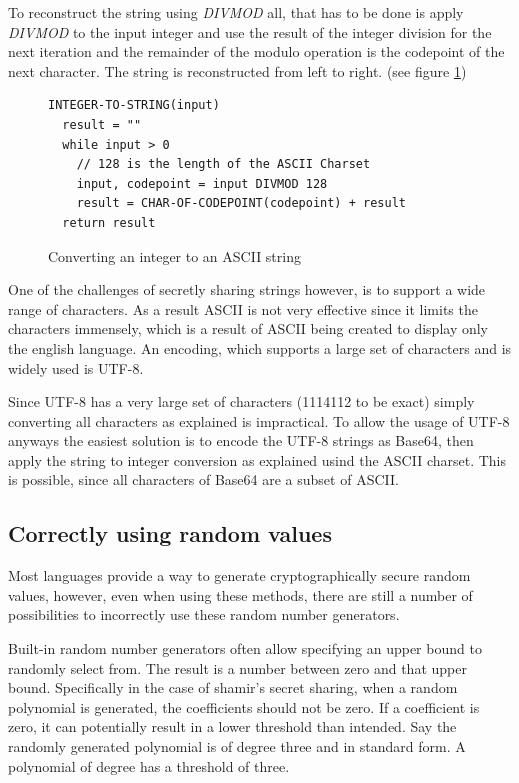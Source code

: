 To reconstruct the string using \textit{DIVMOD} all, that has to be done is
apply \textit{DIVMOD} to the input integer and use the result of the integer
division for the next iteration and the remainder of the modulo operation is
the codepoint of the next character. The string is reconstructed from left to
right. (see figure \ref{code:integerToString})

\begin{figure}
\begin{lstlisting}
INTEGER-TO-STRING(input)
  result = ""
  while input > 0
    // 128 is the length of the ASCII Charset
    input, codepoint = input DIVMOD 128
    result = CHAR-OF-CODEPOINT(codepoint) + result
  return result
\end{lstlisting}
\caption{Converting an integer to an ASCII string}
\label{code:integerToString}
\end{figure}

One of the challenges of secretly sharing strings however, is to support a wide
range of characters. As a result ASCII is not very effective since it limits
the characters immensely, which is a result of ASCII being created to display
only the english language. An encoding, which supports a large set of
characters and is widely used is UTF-8.

Since UTF-8 has a very large set of characters (1114112 to be exact) simply
converting all characters as explained is impractical. To allow the usage of
UTF-8 anyways the easiest solution is to encode the UTF-8 strings as Base64,
then apply the string to integer conversion as explained usind the ASCII
charset. This is possible, since all characters of Base64 are a subset of
ASCII.

\subsection{Correctly using random values}

Most languages provide a way to generate cryptographically secure random
values, however, even when using these methods, there are still a number of
possibilities to incorrectly use these random number generators.

Built-in random number generators often allow specifying an upper bound to
randomly select from. The result is a number between zero and that upper bound.
Specifically in the case of shamir's secret sharing, when a random polynomial
is generated, the coefficients should not be zero. If a coefficient is zero, it
can potentially result in a lower threshold than intended. Say the randomly
generated polynomial is of degree three and in standard form. A polynomial of
degree has a threshold of three.

